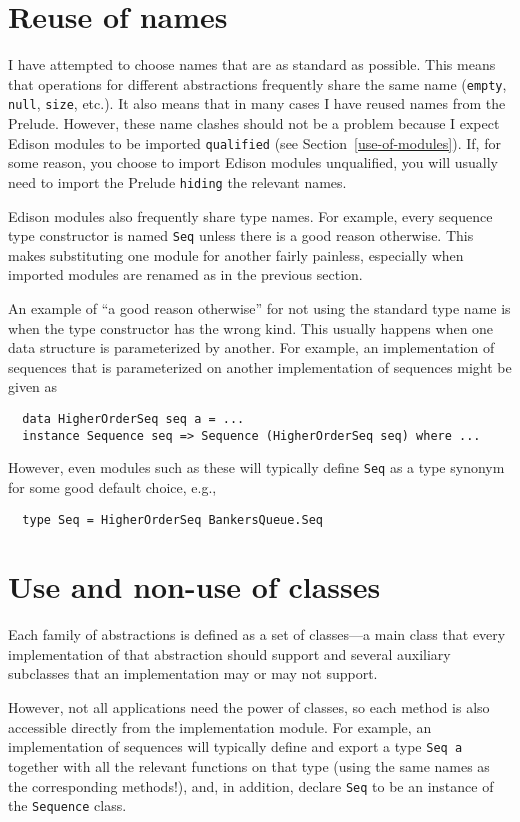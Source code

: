 \documentclass{report}
\newcommand{\cd}{\texttt}
\newcommand{\Section}[1]{Section~\ref{#1}}
\begin{document}
\section{Reuse of names} \label{name-clashes}

I have attempted to choose names that are as standard as possible.
This means that operations for different abstractions frequently share
the same name (\cd{empty}, \cd{null}, \cd{size}, etc.).  It also means
that in many cases I have reused names from the Prelude.  However,
these name clashes should not be a problem because I expect Edison
modules to be imported \cd{qualified} (see \Section{use-of-modules}).
If, for some reason, you choose to import Edison modules unqualified,
you will usually need to import the Prelude \cd{hiding} the relevant
names.

Edison modules also frequently share type names.  For example, every
sequence type constructor is named \cd{Seq} unless there is a good reason
otherwise.  This makes substituting one module for another fairly
painless, especially when imported modules are renamed as in the previous
section.

An example of ``a good reason otherwise'' for not using the standard
type name is when the type constructor has the wrong kind.  This usually
happens when one data structure is parameterized by another.  For example,
an implementation of sequences that is parameterized on
another implementation of sequences might be given as
\begin{verbatim}
  data HigherOrderSeq seq a = ...
  instance Sequence seq => Sequence (HigherOrderSeq seq) where ...
\end{verbatim}
However, even modules such as these will typically define \cd{Seq}
as a type synonym for some good default choice, e.g.,
\begin{verbatim}
  type Seq = HigherOrderSeq BankersQueue.Seq
\end{verbatim}

\section{Use and non-use of classes}

Each family of abstractions is defined as a set of classes---a main
class that every implementation of that abstraction should support and
several auxiliary subclasses that an implementation may or may not support.

However, not all applications need the power of classes, so each method is 
also accessible directly from the implementation module.  For example, an 
implementation of sequences will typically define and export a 
type \cd{Seq~a} together with all the relevant functions on that type
(using the same names as the corresponding methods!), and, in addition, 
declare \cd{Seq} to be an instance of the \cd{Sequence} class.
\end{document}
